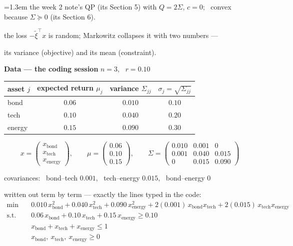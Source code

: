 \documentclass[10pt]{article}
\newenvironment{board}{%
  \par\vspace{4pt}
  \begingroup\leftskip=1.3em\relax\parskip=2pt\relax}{%
  \par\endgroup\vspace{4pt}}
\begin{document}
\begin{board}
\quad the week 2 note's QP (its Section 5) with $Q = 2\Sigma$, $c = 0$; \ convex because $\Sigma \succeq 0$ (its Section 6).
\vspace{3pt}

\quad the loss $-\tilde\xi^{\top}x$ is random; Markowitz collapses it with two numbers ---
\vspace{1pt}

\qquad its variance (objective) and its mean (constraint).
\vspace{12pt}

\textbf{Data --- the coding session} \quad $n = 3$, \ $r = 0.10$
\vspace{5pt}

\begin{center}
\begin{tabular}{@{}l|c|c|c@{}}
 asset $j$ & expected return $\mu_j$ & variance $\Sigma_{jj}$ & $\sigma_j = \sqrt{\Sigma_{jj}}$ \\ \hline
 bond      & $0.06$ & $0.010$ & $0.10$ \\
 tech      & $0.10$ & $0.040$ & $0.20$ \\
 energy    & $0.15$ & $0.090$ & $0.30$ \\
\end{tabular}
\end{center}
\vspace{4pt}

\[
x = \begin{pmatrix} x_{\text{bond}} \\ x_{\text{tech}} \\ x_{\text{energy}} \end{pmatrix},
\qquad
\mu = \begin{pmatrix} 0.06 \\ 0.10 \\ 0.15 \end{pmatrix},
\qquad
\Sigma = \begin{pmatrix} 0.010 & 0.001 & 0 \\ 0.001 & 0.040 & 0.015 \\ 0 & 0.015 & 0.090 \end{pmatrix}
\]

\quad covariances: \ bond--tech $0.001$, \ tech--energy $0.015$, \ bond--energy $0$
\vspace{6pt}

\quad written out term by term --- exactly the lines typed in the code:
\[
\begin{aligned}
  \min\quad & 0.010\,x_{\text{bond}}^2 + 0.040\,x_{\text{tech}}^2 + 0.090\,x_{\text{energy}}^2
              + 2(0.001)\,x_{\text{bond}}x_{\text{tech}} + 2(0.015)\,x_{\text{tech}}x_{\text{energy}} \\
  \text{s.t.}\quad & 0.06\,x_{\text{bond}} + 0.10\,x_{\text{tech}} + 0.15\,x_{\text{energy}} \ge 0.10 \\
                   & x_{\text{bond}} + x_{\text{tech}} + x_{\text{energy}} \le 1 \\
                   & x_{\text{bond}},\ x_{\text{tech}},\ x_{\text{energy}} \ge 0
\end{aligned}
\]


\end{board}
\end{document}

